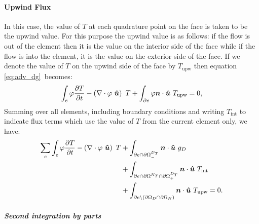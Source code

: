 \paragraph{Upwind Flux}

In this case, the value of $T$ at each quadrature point on the face is taken
to be the upwind value. For this purpose the upwind value is as follows: if
the flow is out of the element then it is the value on the interior side of
the face while if the flow is into the element, it is the value on the
exterior side of the face. If we denote the value of $T$ on the upwind side
of the face by $T_{\mathrm{upw}}$ then equation \eqref{eq:adv_dg}\ becomes:
\begin{equation}\label{eq:adv_dg}
  \int_e \varphi \frac{\partial T}{\partial t} -
    \left(\nabla\cdot \varphi~{\mbox{\boldmath$\hat u$}}\right)~T +
    \int_{\partial e} \varphi{\mbox{\boldmath$n$}}\cdot{\mbox{\boldmath$\hat u$}}~T_{\mathrm{upw}} 
    = 0,
\end{equation}
Summing over all elements, including boundary conditions and writing
$T_\mathrm{int}$ to indicate flux terms which use the value of $T$ from the
current element only, we have:
\begin{equation}
  \begin{split}
    \sum_e \int_e \varphi \frac{\partial T}{\partial t}
    - \left(\nabla\cdot \varphi~{\mbox{\boldmath$\hat u$}}\right)~T 
    &+ \int_{\partial e \cap\partial\Omega^{D_T}_-} {\mbox{\boldmath$n$}}\cdot{\mbox{\boldmath$\hat u$}}~g_D \\
    &+ \int_{\partial e \cap\partial\Omega^{N_T}\cap\partial\Omega^{D_T}_+} {\mbox{\boldmath$n$}}\cdot{\mbox{\boldmath$\hat u$}}~T_{\mathrm{int}} \\
    &+ \int_{\partial e\setminus (\partial\Omega_D\cap\partial\Omega_N)}
    {\mbox{\boldmath$n$}}\cdot{\mbox{\boldmath$\hat u$}}~T_{\mathrm{upw}}=0.
    \label{eq:dg_adv_diff_integrated_once}
  \end{split}
\end{equation}

\subparagraph{Second integration by parts}

